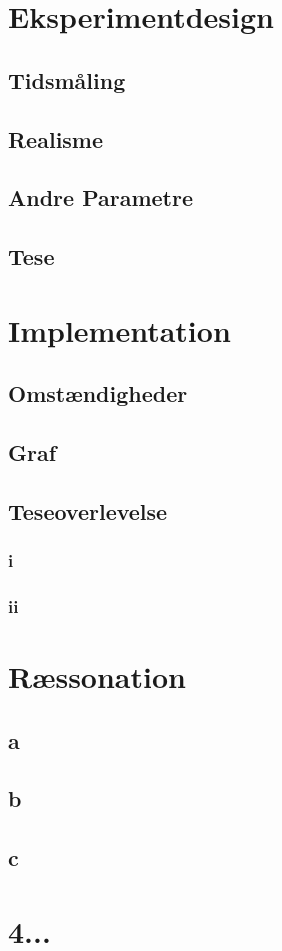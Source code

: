 \documentclass{article}
\author{Mikkel, Jannik, Rune \& Rasmus}
\date{\today}
\begin{document}
\section{Eksperimentdesign}

\subsection{Tidsmåling}

\subsection{Realisme}

\subsection{Andre Parametre}

\subsection{Tese}

\section{Implementation}

\subsection{Omstændigheder}

\subsection{Graf}

\subsection{Teseoverlevelse}

\subsubsection{i}

\subsubsection{ii}

\section{Ræssonation}

\subsection{a}
\subsection{b}
\subsection{c}

\section{4...}
\end{document}

